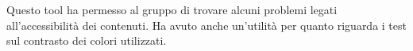 Questo tool ha permesso al gruppo di trovare alcuni problemi legati all'accessibilità dei contenuti. Ha avuto anche un'utilità per quanto riguarda
i test sul contrasto dei colori utilizzati.